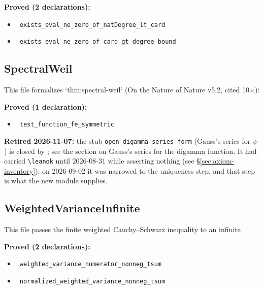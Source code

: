 \documentclass{report}
\theoremstyle{definition}
\begin{document}
\noindent\textbf{Proved (2 declarations):}
\begin{itemize}
  \item {}\leanok\ \texttt{exists\_eval\_ne\_zero\_of\_natDegree\_lt\_card}
  \item {}\leanok\ \texttt{exists\_eval\_ne\_zero\_of\_card\_gt\_degree\_bound}
\end{itemize}

\subsection{SpectralWeil}
This file formalizes `thm:spectral-weil` (On the Nature of Nature v5.2, cited 10×):

\noindent\textbf{Proved (1 declaration):}
\begin{itemize}
  \item {}\leanok\ \texttt{test\_function\_fe\_symmetric}
\end{itemize}

\noindent\textbf{Retired 2026-11-07:} the stub \texttt{open\_digamma\_series\_form} (Gauss's
series for $\psi$) is closed by \leanok; see
the section on Gauss's series for the digamma function. It had carried \texttt{\textbackslash leanok}
until 2026-08-31 while asserting nothing (see \S\ref{sec:axiom-inventory}); on 2026-09-02 it was
narrowed to the uniqueness step, and that step is what the new module supplies.

\subsection{WeightedVarianceInfinite}
This file passes the finite weighted Cauchy--Schwarz inequality to an infinite

\noindent\textbf{Proved (2 declarations):}
\begin{itemize}
  \item {}\leanok\ \texttt{weighted\_variance\_numerator\_nonneg\_tsum}
  \item {}\leanok\ \texttt{normalized\_weighted\_variance\_nonneg\_tsum}
\end{itemize}
\end{document}
